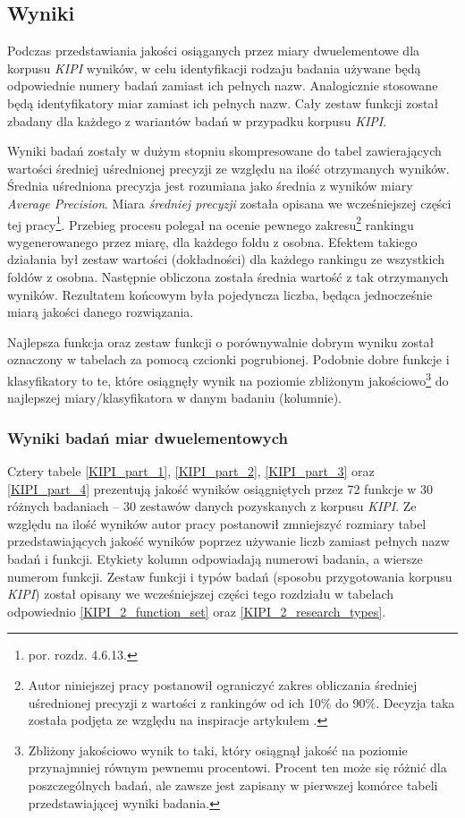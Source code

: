 \subsection{Wyniki}
Podczas przedstawiania jakości osiąganych przez miary dwuelementowe dla korpusu \emph{KIPI} wyników, w celu identyfikacji rodzaju badania używane będą odpowiednie numery badań zamiast ich pełnych nazw.
Analogicznie stosowane będą identyfikatory miar zamiast ich pełnych nazw.
Cały zestaw funkcji został zbadany dla każdego z wariantów badań w przypadku korpusu \emph{KIPI}.

\par
Wyniki badań zostały w dużym stopniu skompresowane do tabel zawierających wartości średniej uśrednionej precyzji ze względu na ilość otrzymanych wyników.
Średnia uśredniona precyzja jest rozumiana jako średnia z wyników miary \emph{Average Precision}.
Miara \emph{średniej precyzji} została opisana we wcześniejszej części tej pracy\footnote{por. rozdz. 4.6.13.}.
Przebieg procesu polegał na ocenie pewnego zakresu\footnote{Autor niniejszej pracy postanowił ograniczyć zakres obliczania średniej uśrednionej precyzji z wartości z rankingów od ich 10\% do 90\%. Decyzja taka została podjęta ze względu na inspiracje artykułem \cite{coling}.} rankingu wygenerowanego przez miarę, dla każdego foldu z osobna.
Efektem takiego działania był zestaw wartości (dokładności) dla każdego rankingu ze wszystkich foldów z osobna.
Następnie obliczona została średnia wartość z tak otrzymanych wyników.
Rezultatem końcowym była pojedyncza liczba, będąca jednocześnie miarą jakości danego rozwiązania.

\par
Najlepsza funkcja oraz zestaw funkcji o porównywalnie dobrym wyniku został oznaczony w tabelach za pomocą czcionki pogrubionej.
Podobnie dobre funkcje i klasyfikatory to te, które osiągnęły wynik na poziomie zbliżonym jakościowo\footnote{Zbliżony jakościowo wynik to taki, który osiągnął jakość na poziomie przynajmniej równym pewnemu procentowi. Procent ten może się różnić dla poszczególnych badań, ale zawsze jest zapisany w pierwszej komórce tabeli przedstawiającej wyniki badania.} do najlepszej miary/klasyfikatora w danym badaniu (kolumnie).


\subsubsection{Wyniki badań miar dwuelementowych}
Cztery tabele \ref{KIPI_part_1}, \ref{KIPI_part_2}, \ref{KIPI_part_3} oraz \ref{KIPI_part_4} prezentują jakość wyników osiągniętych przez 72 funkcje w 30 różnych badaniach -- 30 zestawów danych pozyskanych z korpusu \emph{KIPI}.
Ze względu na ilość wyników autor pracy postanowił zmniejszyć rozmiary tabel przedstawiających jakość wyników poprzez używanie liczb zamiast pełnych nazw badań i funkcji.
Etykiety kolumn odpowiadają numerowi badania, a wiersze numerom funkcji.
Zestaw funkcji i typów badań (sposobu przygotowania korpusu \emph{KIPI}) został opisany we wcześniejszej części tego rozdziału w tabelach odpowiednio \ref{KIPI_2_function_set} oraz \ref{KIPI_2_research_types}.

